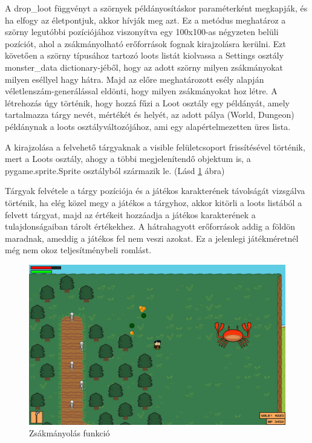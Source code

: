 A drop\_loot függvényt a szörnyek példányosításkor paraméterként megkapják, és ha elfogy az életpontjuk, akkor hívják meg azt.
 Ez a metódus meghatároz a szörny legutóbbi pozíciójához viszonyítva egy 100x100-as négyzeten belüli pozíciót,
  ahol a zsákmányolható erőforrások fognak kirajzolásra kerülni.
   Ezt követően a szörny típusához tartozó loots listát kiolvassa a Settings osztály monster\_data dictionary-jéből,
    hogy az adott szörny milyen zsákmányokat milyen eséllyel hagy hátra.
     Majd az előre meghatározott esély alapján véletlenszám-generálással eldönti,
      hogy milyen zsákmányokat hoz létre. A létrehozás úgy történik,
       hogy hozzá fűzi a Loot osztály egy példányát, amely tartalmazza tárgy nevét, mértékét és helyét,  az adott pálya (World, Dungeon) példánynak a loots osztályváltozójához, ami egy alapértelmezetten üres lista. 

A kirajzolása a felvehető tárgyaknak a visible felületcsoport frissítésével történik,
 mert a Loots osztály, ahogy a többi megjelenítendő objektum is, a pygame.sprite.Sprite osztályból származik le. (Lásd \ref{fig:Zsákmányolás funkció} ábra)

Tárgyak felvétele a tárgy pozíciója és a játékos karakterének távolságát vizsgálva történik,
 ha elég közel megy a játékos a tárgyhoz, akkor kitörli a loots listából a felvett tárgyat, majd az értékeit hozzáadja
  a játékos karakterének a tulajdonságaiban tárolt értékekhez.
   A hátrahagyott erőforrások addig a földön maradnak, ameddig a játékos fel nem veszi azokat.
    Ez a jelenlegi játékméretnél még nem okoz teljesítménybeli romlást. 

\begin{figure}[H]
    \centering
    \includegraphics[width=14truecm]{images/loots.png}
    \caption{Zsákmányolás funkció}
    \label{fig:Zsákmányolás funkció}
\end{figure}

